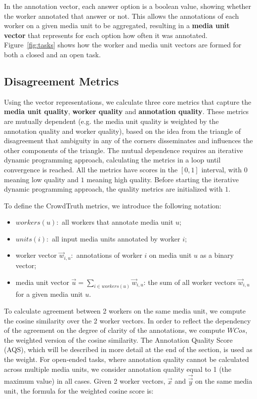 In the annotation vector, each answer option is a boolean value, showing whether the worker annotated that answer or not. This allows the annotations of each worker on a given media unit to be aggregated, resulting in a \textbf{media unit vector} that represents for each option how often it was annotated. Figure~\ref{fig:tasks} shows how the worker and media unit vectors are formed for both a closed and an open task.

\subsection{Disagreement Metrics}
\label{sec:metrics}

Using the vector representations, we calculate three core metrics that capture the \textbf{media unit quality}, \textbf{worker quality} and \textbf{annotation quality}. These metrics are mutually dependent (e.g. the media unit quality is weighted by the annotation quality and worker quality), based on the idea from the triangle of disagreement that ambiguity in any of the corners disseminates and influences the other components of the triangle. The mutual dependence requires an iterative dynamic programming approach, calculating the metrics in a loop until convergence is reached. All the metrics have scores in the $[0,1]$ interval, with $0$ meaning low quality and $1$ meaning high quality. Before starting the iterative dynamic programming approach, the quality metrics are initialized with $1$. %

To define the CrowdTruth metrics, we introduce the following notation:
\begin{itemize}
\item $workers(u):$ all workers that annotate media unit $u$;
\item $units(i):$ all input media units annotated by worker $i$;
\item worker vector $\vec{w}_{i, u}:$ annotations of worker $i$ on media unit $u$ as a binary vector;
\item media unit vector $\vec{u} = \sum\limits_{i \in workers(u)} \vec{w}_{i,u}$: the sum of all worker vectors $\vec{w}_{i,u}$ for a given media unit $u$.
\end{itemize}

To calculate agreement between 2 workers on the same media unit, we compute the cosine similarity over the 2 worker vectors. In order to reflect the dependency of the agreement on the degree of clarity of the annotations, we compute $WCos$, the weighted version of the cosine similarity. The Annotation Quality Score (AQS), which will be described in more detail at the end of the section, is used as the weight. For open-ended tasks, where annotation quality cannot be calculated across multiple media units, we consider annotation quality equal to 1 (the maximum value) in all cases. Given 2 worker vectors, $\vec{x}$ and $\vec{\vec{y}}$ on the same media unit, the formula for the weighted cosine score is:

